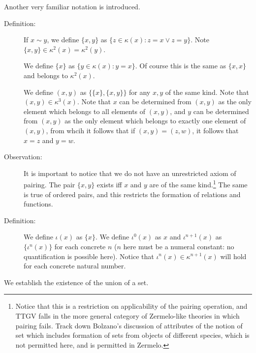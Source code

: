 \documentclass[12pt]{article}
\begin{document}
Another very familiar notation is introduced.

\begin{description}

\item[Definition:]  If $x \sim y$, we define $\{x,y\}$ as $\{z \in \kappa(x):z = x \vee z = y\}$.
Note $\{x,y\} \in \kappa^2(x)=\kappa^2(y)$.

We define $\{x\}$ as $\{y \in \kappa(x):y=x\}$.  Of course this is the same as $\{x,x\}$ and belongs to $\kappa^2(x)$.

We define $(x,y)$ as $\{\{x\},\{x,y\}\}$ for any $x,y$ of the same kind.  Note that $(x,y) \in \kappa^3(x)$.  Note that $x$ can be determined from $(x,y)$ as the only element which belongs to all  elements of $(x,y)$, and $y$ can be determined from $(x,y)$ as the only element which belongs to exactly one element of $(x,y)$, from whcih it follows that if $(x,y)=(z,w)$, it follows that $x=z$ and $y=w$.

\item[Observation:]  It is important to notice that we do not have an unrestricted axiom of pairing.  The pair $\{x,y\}$ exists iff $x$ and $y$ are of the same kind.\footnote{Notice that this is a restriction on applicability of the pairing operation, and TTGV falls in the more general category of Zermelo-like theories in which pairing fails. Track down Bolzano's discussion of attributes of the notion of set which includes formation of sets from objects of different species, which is not permitted here, and is permitted in Zermelo.}  The same is true of ordered pairs, and this restricts the formation of relations and functions.

\item[Definition:]  We define $\iota(x)$ as $\{x\}$.  We define $\iota^0(x)$ as $x$ and $\iota^{n+1}(x)$ as $\{\iota^n(x)\}$ for each concrete $n$ ($n$ here must be a numeral constant:  no quantification is possible here).  Notice that $\iota^n(x) \in \kappa^{n+1}(x)$ will hold for each concrete natural number.

\end{description}

We establish the existence of the union of a set.
\end{document}
